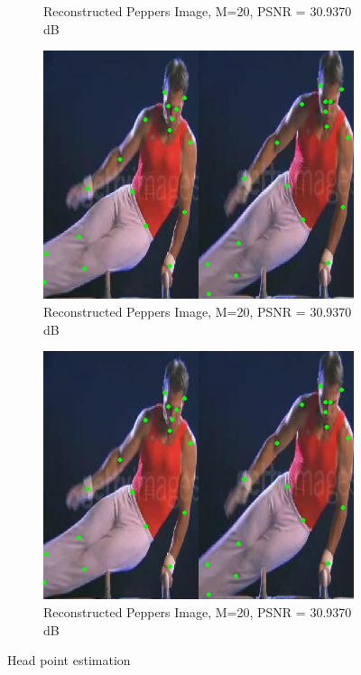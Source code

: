 \documentclass[conference]{IEEEtran}
\begin{document}
\begin{figure}[htbp]{}
\begin{subfigure}[t]{1.6cm}
\caption{Reconstructed Peppers Image, M=20, PSNR = 30.9370 dB} 
\label{caro2}
\end{subfigure}
\begin{subfigure}[t]{1.6cm}
\includegraphics[width=\linewidth, height=\linewidth]{dm1}
\caption{Reconstructed Peppers Image, M=20, PSNR = 30.9370 dB} 
\label{caro3}
\end{subfigure}
\begin{subfigure}[t]{1.6cm}
\includegraphics[width=\linewidth, height=\linewidth]{dm1}
\caption{Reconstructed Peppers Image, M=20, PSNR = 30.9370 dB} 
\label{caro3}
\end{subfigure}
\caption{Head point estimation}
\label{NITRAres1} 
\end{figure}
\end{document}
